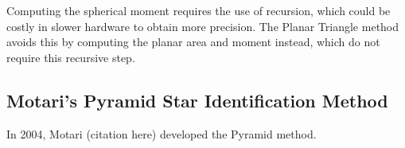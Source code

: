 Computing the spherical moment requires the use of recursion, which could be costly in slower hardware to obtain more precision. The Planar Triangle method avoids this by computing the planar area and moment instead, which do not require this recursive step.

\subsection{Motari's Pyramid Star Identification Method}
In 2004, Motari (citation here) developed the Pyramid method. 

